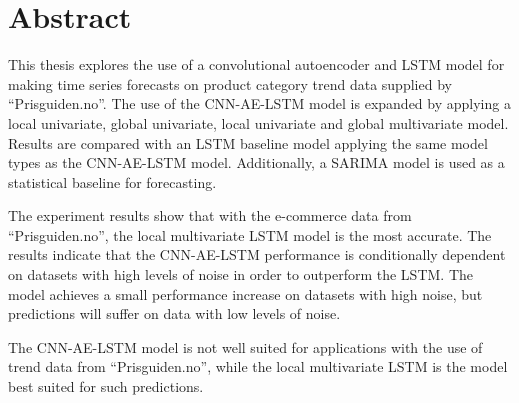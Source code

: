 \section*{Abstract}
\label{section:Abstract}





This thesis explores the use of a convolutional autoencoder and LSTM model for making time series
forecasts on product category trend data supplied by ``Prisguiden.no''.
The use of the CNN-AE-LSTM model is expanded by applying a local univariate, global univariate, local univariate and global multivariate model.
Results are compared with an LSTM baseline model applying the same model types as the CNN-AE-LSTM model.
Additionally, a SARIMA model is used as a statistical baseline for forecasting.


The experiment results show that with the e-commerce data from ``Prisguiden.no'',
the local multivariate LSTM model is the most accurate.
The results indicate that the CNN-AE-LSTM performance is conditionally dependent on datasets with high levels of noise in order to outperform the LSTM.
The model achieves a small performance increase on datasets with high noise, but predictions will suffer
on data with low levels of noise.

The CNN-AE-LSTM model is not well suited for applications with the use of trend data from ``Prisguiden.no'',
while the local multivariate LSTM is the model best suited for such predictions.







